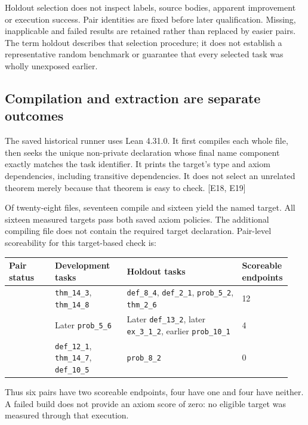 Holdout selection does not inspect labels, source bodies, apparent improvement or execution success. Pair identities are fixed before later qualification. Missing, inapplicable and failed results are retained rather than replaced by easier pairs. The term holdout describes that selection procedure; it does not establish a representative random benchmark or guarantee that every selected task was wholly unexposed earlier.

\subsection[Compilation and extraction are separate outcomes]{\texorpdfstring{\protect\hypertarget{d2}{}Compilation and extraction are separate outcomes}{Compilation and extraction are separate outcomes}}
The saved historical runner uses Lean 4.31.0. It first compiles each whole file, then seeks the unique non-private declaration whose final name component exactly matches the task identifier. It prints the target's type and axiom dependencies, including transitive dependencies. It does not select an unrelated theorem merely because that theorem is easy to check. [E18, E19]

Of twenty-eight files, seventeen compile and sixteen yield the named target. All sixteen measured targets pass both saved axiom policies. The additional compiling file does not contain the required target declaration. Pair-level scoreability for this target-based check is:

\begingroup\small\setlength{\tabcolsep}{3pt}\renewcommand{\arraystretch}{1.14}
\par\nopagebreak\medskip\noindent\begin{minipage}[t]{\linewidth}
\begin{tabular}{>{\raggedright\arraybackslash}p{0.16\linewidth}>{\raggedright\arraybackslash}p{0.25\linewidth}>{\raggedright\arraybackslash}p{0.4\linewidth}>{\raggedright\arraybackslash}p{0.13\linewidth}}
\toprule
\textbf{Pair status} & \textbf{Development tasks} & \textbf{Holdout tasks} & \textbf{Scoreable endpoints}\\\midrule

{Both endpoints} & {\nolinkurl{thm_14_3}, \nolinkurl{thm_14_8}} & {\nolinkurl{def_8_4}, \nolinkurl{def_2_1}, \nolinkurl{prob_5_2}, \nolinkurl{thm_2_6}} & {12}\\
{One endpoint} & {Later \nolinkurl{prob_5_6}} & {Later \nolinkurl{def_13_2}, later \nolinkurl{ex_3_1_2}, earlier \nolinkurl{prob_10_1}} & {4}\\
{Neither endpoint} & {\nolinkurl{def_12_1}, \nolinkurl{thm_14_7}, \nolinkurl{def_10_5}} & {\nolinkurl{prob_8_2}} & {0}\\
\bottomrule\end{tabular}\end{minipage}\par\medskip\endgroup
Thus six pairs have two scoreable endpoints, four have one and four have neither. A failed build does not provide an axiom score of zero: no eligible target was measured through that execution.

